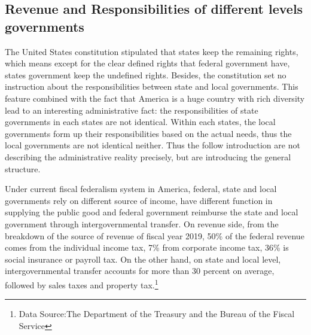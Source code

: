 \subsection{Revenue and Responsibilities of different levels governments}
The United States constitution stipulated that states keep the remaining rights, which means except for the clear defined rights that federal government have, states government keep the undefined rights. Besides, the constitution set no instruction about the responsibilities between state and local governments. This feature combined with the fact that America is a huge country with rich diversity lead to an interesting administrative fact: the responsibilities of state governments in each states are not identical. Within each states, the local governments form up their responsibilities based on the actual needs, thus the local governments are not identical neither. Thus the follow introduction are not describing the administrative reality precisely, but are introducing the general structure.

Under current fiscal federalism system in America, federal, state and local governments rely on different source of income, have different function in supplying the public good and federal government reimburse the state and local government through intergovernmental transfer. On revenue side, from the breakdown of the source of revenue of fiscal year 2019, 50\% of the federal revenue comes from the individual income tax, 7\% from corporate income tax, 36\% is social insurance or payroll tax. On the other hand, on state and local level, intergovernmental transfer accounts for more than 30 percent on average, followed by sales taxes and property tax.\footnote[1]{Data Source:The Department of the Treasury and the Bureau of the Fiscal Service}

